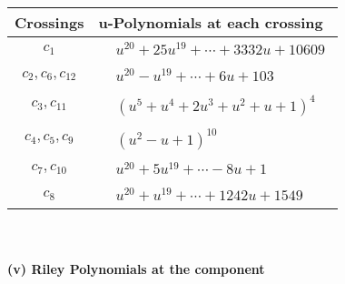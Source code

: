 \documentclass[1p]{elsarticle_modified}
\theoremstyle{definition}
\begin{document}
\begin{tabular}{m{50pt}|m{274pt}}
Crossings & \hspace{64pt}u-Polynomials at each crossing \\
\hline $$\begin{aligned}c_{1}\end{aligned}$$&$\begin{aligned}
&u^{20}+25 u^{19}+\cdots+3332 u+10609
\end{aligned}$\\
\hline $$\begin{aligned}c_{2},c_{6},c_{12}\end{aligned}$$&$\begin{aligned}
&u^{20}- u^{19}+\cdots+6 u+103
\end{aligned}$\\
\hline $$\begin{aligned}c_{3},c_{11}\end{aligned}$$&$\begin{aligned}
&(u^5+u^4+2 u^3+u^2+u+1)^4
\end{aligned}$\\
\hline $$\begin{aligned}c_{4},c_{5},c_{9}\end{aligned}$$&$\begin{aligned}
&(u^2- u+1)^{10}
\end{aligned}$\\
\hline $$\begin{aligned}c_{7},c_{10}\end{aligned}$$&$\begin{aligned}
&u^{20}+5 u^{19}+\cdots-8 u+1
\end{aligned}$\\
\hline $$\begin{aligned}c_{8}\end{aligned}$$&$\begin{aligned}
&u^{20}+u^{19}+\cdots+1242 u+1549
\end{aligned}$\\
\hline
\end{tabular}\\~\\
\newpage\renewcommand{\arraystretch}{1}
\flushleft \textbf{(v) Riley Polynomials at the component}\newline \\
\end{document}
